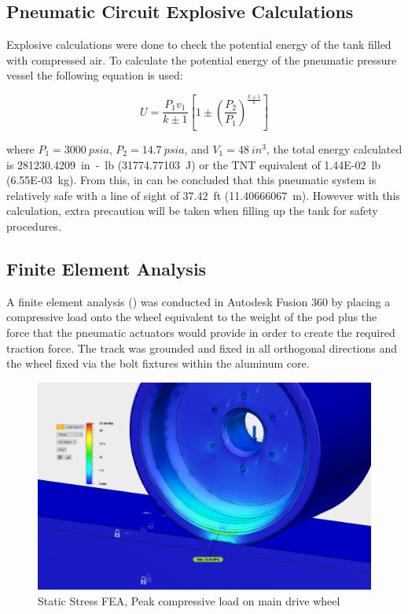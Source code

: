 \documentclass[main.tex]{subfiles}
\begin{document}
     \subsection{Pneumatic Circuit Explosive Calculations}
    Explosive calculations were done to check the potential energy of the tank filled with compressed air. To calculate the potential energy of the pneumatic pressure vessel the following equation is used:\\
    \begin{center}
        \[
        U = \frac{P_1 v_1}{k\pm{1}} [1\pm(\frac{P_2}{P_1})^ \frac{k\pm{1}}{k}]
        \]
	\end{center}
	where ${P_1}=\SI{3000}{psia}$, ${P_2}=\SI{14.7}{psia}$, and ${V_1}=\SI{48}{in^3}$, the total energy calculated is \SI{281230.4209}{in-lb} (\SI{31774.77103}{J}) or the  TNT equivalent of \SI{1.44E-02}{lb} (\SI{6.55E-03}{kg}). From this, in can be concluded that this pneumatic system is relatively safe with a line of sight of \SI{37.42}{ft} (\SI{11.40666067}{m}). However with this calculation, extra precaution will be taken when filling up the tank for safety procedures.

    \subsection{Finite Element Analysis}

    A finite element analysis () was conducted in Autodesk Fusion 360 by placing a compressive load onto the wheel equivalent to the weight of the pod plus the force that the pneumatic actuators would provide in order to create the required traction force. The track was grounded and fixed in all orthogonal directions and the wheel fixed via the bolt fixtures within the aluminum core.\\

\begin{figure}
        \centering
        \includegraphics[width=\linewidth]{images/fig21}
        \caption{Static Stress FEA, Peak compressive load on main drive wheel}
        \label{fig:drive-wheel-stress}
    \end{figure}
\end{document}
